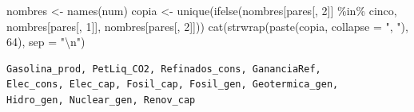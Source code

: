 \documentclass[oneside, openany, fontset=libertinus]{mitthesis}
\newenvironment{Shaded}{\begin{snugshade}}{\end{snugshade}}
\newcommand{\AttributeTok}[1]{\textcolor[rgb]{0.40,0.45,0.13}{#1}}
\newcommand{\DecValTok}[1]{\textcolor[rgb]{0.68,0.00,0.00}{#1}}
\newcommand{\FunctionTok}[1]{\textcolor[rgb]{0.28,0.35,0.67}{#1}}
\newcommand{\NormalTok}[1]{\textcolor[rgb]{0.00,0.23,0.31}{#1}}
\newcommand{\OtherTok}[1]{\textcolor[rgb]{0.00,0.23,0.31}{#1}}
\newcommand{\SpecialCharTok}[1]{\textcolor[rgb]{0.37,0.37,0.37}{#1}}
\newcommand{\StringTok}[1]{\textcolor[rgb]{0.13,0.47,0.30}{#1}}
\begin{document}
\begin{Shaded}
\begin{Highlighting}[]
\NormalTok{nombres }\OtherTok{\textless{}{-}} \FunctionTok{names}\NormalTok{(num)}
\NormalTok{copia }\OtherTok{\textless{}{-}} \FunctionTok{unique}\NormalTok{(}\FunctionTok{ifelse}\NormalTok{(nombres[pares[, }\DecValTok{2}\NormalTok{]] }\SpecialCharTok{\%in\%}\NormalTok{ cinco,}
\NormalTok{                       nombres[pares[, }\DecValTok{1}\NormalTok{]], nombres[pares[, }\DecValTok{2}\NormalTok{]]))}
\FunctionTok{cat}\NormalTok{(}\FunctionTok{strwrap}\NormalTok{(}\FunctionTok{paste}\NormalTok{(copia, }\AttributeTok{collapse =} \StringTok{", "}\NormalTok{), }\DecValTok{64}\NormalTok{), }\AttributeTok{sep =} \StringTok{"}\SpecialCharTok{\textbackslash{}n}\StringTok{"}\NormalTok{)}
\end{Highlighting}
\end{Shaded}

\begin{verbatim}
Gasolina_prod, PetLiq_CO2, Refinados_cons, GananciaRef,
Elec_cons, Elec_cap, Fosil_cap, Fosil_gen, Geotermica_gen,
Hidro_gen, Nuclear_gen, Renov_cap
\end{verbatim}

\Needspace{4.56in}
\end{document}

